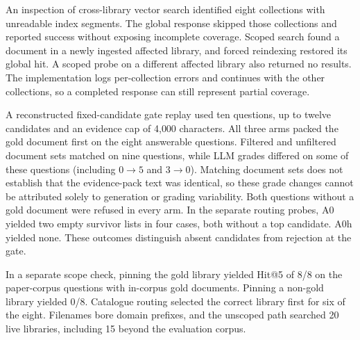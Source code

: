 An inspection of cross-library vector search identified eight collections
with unreadable index segments. The global response skipped those
collections and reported success without exposing incomplete coverage.
Scoped search found a document in a newly ingested affected library,
and forced reindexing restored its global hit. A scoped probe on a
different affected library also returned no results. The implementation
logs per-collection errors and continues with the other collections, so
a completed response can still represent partial coverage.

A reconstructed fixed-candidate gate replay used ten questions, up to twelve
candidates and an evidence cap of 4{,}000 characters. All three arms
packed the gold document first on the eight answerable questions.
Filtered and unfiltered document sets matched on nine questions, while
LLM grades differed on some of these questions (including $0\to5$ and
$3\to0$). Matching document sets does not establish that the evidence-pack
text was identical, so these grade changes cannot be attributed solely to
generation or grading variability. Both questions without a gold document
were refused in every
arm. In the separate routing probes, A0 yielded two empty survivor
lists in four cases, both without a top candidate. A0h yielded none.
These outcomes distinguish absent candidates from rejection at the gate.

In a separate scope check, pinning the gold library yielded Hit@5 of
8/8 on the paper-corpus questions with in-corpus gold documents. Pinning a
non-gold library yielded 0/8. Catalogue routing selected the correct
library first for six of the eight. Filenames bore domain prefixes,
and the unscoped path searched 20 live libraries, including 15 beyond
the evaluation corpus.
